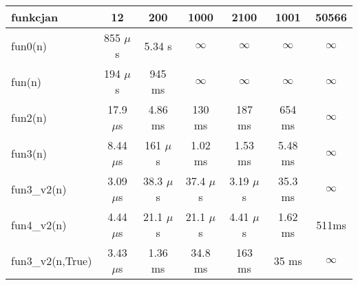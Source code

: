 \documentclass[a4paper, 50pt]{standalone}
\begin{document}
	
\begin{tabular}{|l|c|c|c|c|c|c|}
	\hline
	funkcja\phantom{12345}n &     12      &     200     &    1000     &    2100     &   1001   &  50566   \\ \hline
	fun0(n)                    & 855 $\mu$s  &   5.34 s    &  $\infty$   &  $\infty$   & $\infty$ & $\infty$ \\ \hline
	fun(n)                     & 194 $\mu$s  &   945 ms    &  $\infty$   &  $\infty$   & $\infty$ & $\infty$ \\ \hline
	fun2(n)                    & 17.9 $\mu$s &   4.86 ms   &   130 ms    &   187 ms    &  654 ms  & $\infty$ \\ \hline
	fun3(n)                    & 8.44 $\mu$s & 161 $\mu$s  &   1.02 ms   &   1.53 ms   & 5.48 ms  & $\infty$ \\ \hline
	fun3\_v2(n)                & 3.09 $\mu$s & 38.3 $\mu$s & 37.4 $\mu$s & 3.19 $\mu$s & 35.3 ms  & $\infty$ \\ \hline
	fun4\_v2(n)                & 4.44 $\mu$s & 21.1 $\mu$s & 21.1 $\mu$s & 4.41 $\mu$s & 1.62 ms  &  511ms   \\ \hline
	fun3\_v2(n,True)           & 3.43 $\mu$s &   1.36 ms   &   34.8 ms   &   163 ms    &  35 ms   & $\infty$ \\ \hline
\end{tabular}

	

	
	
	
	
\end{document}
